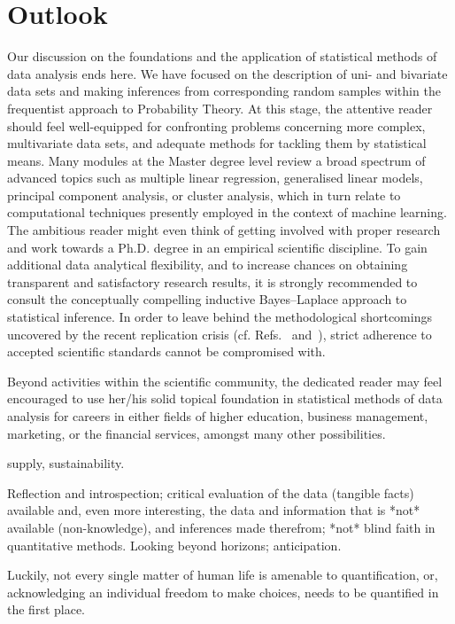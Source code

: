 \chapter*{Outlook}
Our discussion on the foundations and the application of
statistical methods of data analysis ends here. We have focused on
the description of uni- and bivariate data sets and making
inferences from corresponding random samples within the frequentist
approach to Probability Theory. At this stage, the attentive
reader should feel well-equipped for confronting problems
concerning more complex, multivariate data sets, and adequate
methods for tackling them by statistical means. Many modules at the
Master degree level review a broad spectrum of advanced topics such
as multiple linear regression, generalised linear models, principal
component analysis, or cluster analysis, which in turn relate to
computational techniques presently employed in the context of
machine learning. The ambitious reader might even think of getting
involved with proper research and work towards a Ph.D. degree in an
empirical scientific discipline. To gain additional data analytical
flexibility, and to increase chances on obtaining transparent
and satisfactory research results, it is strongly recommended to
consult the conceptually compelling inductive Bayes--Laplace
approach to statistical inference. In order to leave behind the
methodological shortcomings uncovered by the recent replication
crisis (cf. Refs.~ and~), strict adherence
to accepted scientific standards cannot be compromised with. 

\medskip
\noindent
Beyond activities within the scientific community, the dedicated
reader may feel encouraged to use her/his solid topical foundation
in statistical methods of data analysis for careers in either
fields of higher education, business management, marketing, or the
financial services, amongst many other possibilities.

supply, sustainability.

Reflection and introspection; critical evaluation of the data
(tangible facts) available and, even more interesting,
the data and information that is *not* available (non-knowledge),
and inferences made therefrom; *not* blind faith in quantitative
methods. Looking beyond horizons; anticipation.

\medskip
\noindent
Luckily, not every single matter of human life is amenable to
quantification, or, acknowledging an individual freedom to make
choices, needs to be quantified in the first place.

